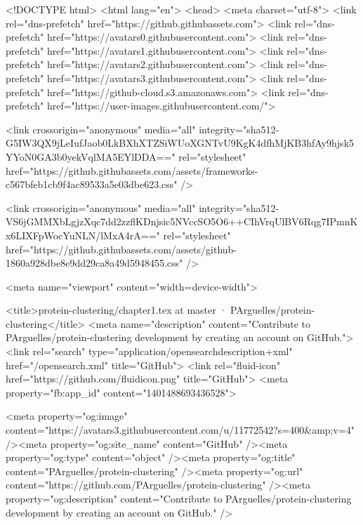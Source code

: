 





<!DOCTYPE html>
<html lang="en">
  <head>
    <meta charset="utf-8">
  <link rel="dns-prefetch" href="https://github.githubassets.com">
  <link rel="dns-prefetch" href="https://avatars0.githubusercontent.com">
  <link rel="dns-prefetch" href="https://avatars1.githubusercontent.com">
  <link rel="dns-prefetch" href="https://avatars2.githubusercontent.com">
  <link rel="dns-prefetch" href="https://avatars3.githubusercontent.com">
  <link rel="dns-prefetch" href="https://github-cloud.s3.amazonaws.com">
  <link rel="dns-prefetch" href="https://user-images.githubusercontent.com/">



  <link crossorigin="anonymous" media="all" integrity="sha512-G5IW3QX9jLeIufJaob0LkBXhXTZSiWUoXGNTvU9KgK4dfhMjKB3hfAy9hjsk5YYoN0GA3b0yekVqlMA5EYlDDA==" rel="stylesheet" href="https://github.githubassets.com/assets/frameworks-c567bfeb1cb9f4ac89533a5e03dbe623.css" />
  
    <link crossorigin="anonymous" media="all" integrity="sha512-VS6jGMMXbLgjzXqc7dd2zzflKDnjsic5NVccSO5O6++CIhVrqUlBV6Rqg7IPmnKx6LIXFpWocYuNLN/lMxA4rA==" rel="stylesheet" href="https://github.githubassets.com/assets/github-1860a928dbe8e9dd29ca8a49d5948455.css" />
    
    
    
    

  <meta name="viewport" content="width=device-width">
  
  <title>protein-clustering/chapter1.tex at master · PArguelles/protein-clustering</title>
    <meta name="description" content="Contribute to PArguelles/protein-clustering development by creating an account on GitHub.">
    <link rel="search" type="application/opensearchdescription+xml" href="/opensearch.xml" title="GitHub">
  <link rel="fluid-icon" href="https://github.com/fluidicon.png" title="GitHub">
  <meta property="fb:app_id" content="1401488693436528">

    
    <meta property="og:image" content="https://avatars3.githubusercontent.com/u/11772542?s=400&amp;v=4" /><meta property="og:site_name" content="GitHub" /><meta property="og:type" content="object" /><meta property="og:title" content="PArguelles/protein-clustering" /><meta property="og:url" content="https://github.com/PArguelles/protein-clustering" /><meta property="og:description" content="Contribute to PArguelles/protein-clustering development by creating an account on GitHub." />

